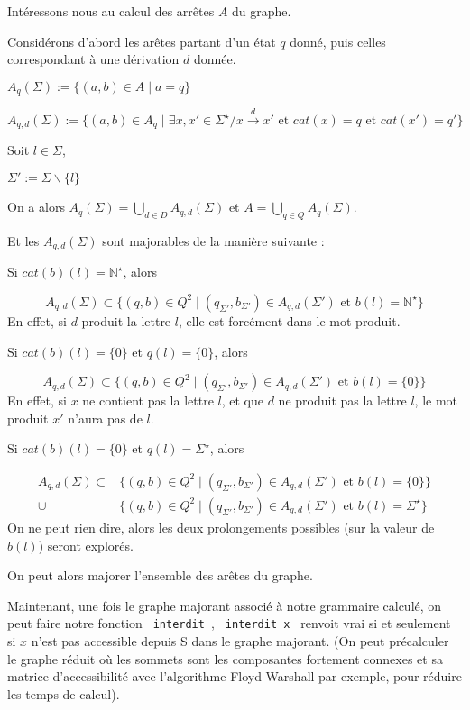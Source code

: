 \documentclass[a4paper,12pt]{article}
\newlength{\mydepth}
\newlength{\myheight}
\newenvironment{answer}
{\par\begin{lrbox}{\mybox}\quad\begin{minipage}{\linewidth}\color{black}\setlength{\parskip}{10pt plus 1pt minus 1pt}\vspace*{-.7\baselineskip}}
{\end{minipage}\end{lrbox}
\settodepth{\mydepth}{\usebox{\mybox}}
\settoheight{\myheight}{\usebox{\mybox}}
\addtolength{\myheight}{\mydepth}
\noindent\makebox[0pt]{
  \color{gray}\hspace{-0pt}\rule[-\mydepth]{1pt}{\myheight}}
  \usebox{\mybox}
  }
\begin{document}
Intéressons nous au calcul des arrêtes $A$ du graphe.

Considérons d'abord les arêtes partant d'un état $q$ donné, puis celles correspondant à une dérivation $d$ donnée.

$A_q(\Sigma) := \{(a,b) \in A \mid a = q\}$

$A_{q,d}(\Sigma) := \{(a,b) \in A_q \mid \exists x,x' \in \Sigma^\star / x \overset{d}{\rightarrow} x' \text{ et } cat(x) = q \text{ et } cat(x') = q'\}$

Soit $l \in \Sigma$,

\begin{answer} 
$\Sigma ' := \Sigma \backslash \{l\}$

On a alors $A_q(\Sigma) = \bigcup_{d \in D} A_{q,d}(\Sigma)$ et $A = \bigcup_{q \in Q} A_q(\Sigma)$.

Et les $A_{q,d}(\Sigma)$ sont majorables de la manière suivante : 


Si $cat(b)(l) = \mathbb{N}^\star$, alors
\begin{answer} 
\begin{equation*}A_{q,d}(\Sigma) \subset \{(q,b) \in Q^2 \mid (q_{\Sigma '},b_{\Sigma '}) \in A_{q,d}(\Sigma ') \text{ et } b(l) = \mathbb{N}^\star\}\end{equation*}
En effet, si $d$ produit la lettre $l$, elle est forcément dans le mot produit.
\end{answer}


Si $cat(b)(l) = \{0\}$ et $q(l) = \{0\}$, alors 
\begin{answer} 
\begin{equation*}A_{q,d}(\Sigma) \subset \{(q,b) \in Q^2 \mid (q_{\Sigma '},b_{\Sigma '}) \in A_{q,d}(\Sigma ') \text{ et } b(l) = \{0\}\}\end{equation*}
En effet, si $x$ ne contient pas la lettre $l$, et que $d$ ne produit pas la lettre $l$, le mot produit $x'$ n'aura pas de $l$.
\end{answer}


Si $cat(b)(l) = \{0\}$ et $q(l) = \Sigma^\star$, alors
\begin{answer} 
\begin{align*}
A_{q,d}(\Sigma) \subset &\{(q,b) \in Q^2 \mid (q_{\Sigma '},b_{\Sigma '}) \in A_{q,d}(\Sigma ') \text{ et } b(l) = \{0\}\} \\
\cup &\{(q,b) \in Q^2 \mid (q_{\Sigma '},b_{\Sigma '}) \in A_{q,d}(\Sigma ') \text{ et } b(l) = \Sigma^\star\}
\end{align*}
On ne peut rien dire, alors les deux prolongements possibles (sur la valeur de $b(l)$) seront explorés.
\end{answer}
\end{answer}

On peut alors majorer l'ensemble des arêtes du graphe.

Maintenant, une fois le graphe majorant associé à notre grammaire calculé, on peut faire notre fonction \texttt{ interdit },
 \texttt{ interdit x } renvoit vrai si et seulement si $x$ n'est pas accessible depuis S dans le graphe majorant.
 (On peut précalculer le graphe réduit où les sommets sont les composantes fortement connexes et sa matrice
 d'accessibilité avec l'algorithme Floyd Warshall par exemple, pour réduire les temps de calcul).
\end{document}
